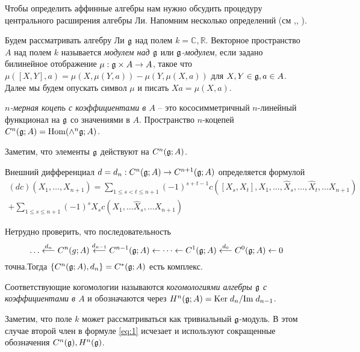 Чтобы определить аффинные алгебры нам нужно обсудить процедуру центрального расширения алгебры Ли.
Напомним несколько определений (см \cite{fuks1986cohomology},\cite{fuks1984}, \cite{feigin1988}).
\begin{definition}
\label{def:1}
Будем рассматривать алгебру Ли $\mathfrak{g}$ над полем $k=\mathbb{C},\mathbb{R}$. Векторное пространство $A$ над полем $k$ называется {\it модулем над $\mathfrak{g}$} или {\it $\mathfrak{g}$-модулем}, если задано билинейное отображение $\mu:\mathfrak{g}\times A\to A$, такое что $\mu([X,Y],a)=\mu(X,\mu(Y,a))-\mu(Y,\mu(X,a))$ для $X,Y\in \mathfrak{g}, a\in A$. Далее мы будем опускать символ $\mu$ и писать $X a= \mu(X,a)$.
\end{definition}
\begin{definition}
  {\it $n$-мерная коцепь с коэффициентами в $A$} -- это кососимметричный $n$-линейный функционал на $\mathfrak{g}$ со значениями в $A$. Пространство $n$-коцепей $C^{n}(\mathfrak{g};A)=\mathrm{Hom}(\wedge^{n}\mathfrak{g};A)$.
\end{definition}
Заметим, что элементы $\mathfrak{g}$ действуют на $C^{n}(\mathfrak{g};A)$.
\begin{definition}
  Внешний дифференциал $d=d_{n}:C^{n}(\mathfrak{g};A)\to C^{n+1}(\mathfrak{g};A)$ определяется формулой
  \begin{multline}
    \label{eq:68}
    (dc) (X_{1},\dots, X_{n+1})=\sum_{1\leq s<t\leq n+1} (-1)^{s+t-1} c([X_{s},X_{t}],X_{1},\dots,\hat X_{s},\dots,\hat X_{t},\dots X_{n+1})\\
    +\sum_{1\leq s\leq n+1} (-1)^{s}X_{s} c(X_{1},\dots \hat X_{s},\dots X_{n+1})
  \end{multline}
\end{definition}
Нетрудно проверить, что последовательность
\begin{equation}
  \label{eq:40}
  \dots\stackrel{d_{n}}{\longleftarrow} C^{n}(g;A)\stackrel{d_{n-1}}{\longleftarrow} C^{n-1}(\mathfrak{g};A)\leftarrow \dots \leftarrow C^{1}(\mathfrak{g};A) \stackrel{d_{0}}{\longleftarrow} C^{0}(\mathfrak{g};A)\leftarrow 0
\end{equation}
точна.Тогда $\{C^{n}(\mathfrak{g};A),d_{n}\}=C^{*}(\mathfrak{g};A)$ есть комплекс.
\begin{definition}
Соответствующие когомологии называются {\it когомологиями алгебры $\mathfrak{g}$ с коэффициентами в $A$} и обозначаются через $H^{n}(\mathfrak{g};A)=\mathrm{Ker}\; d_{n}/\mathrm{Im}\; d_{n-1}$. 
  
\end{definition}
Заметим, что поле $k$ может рассматриваться как тривиальный $\mathfrak{g}$-модуль. В этом случае второй член в формуле \eqref{eq:1} исчезает и используют сокращенные обозначения $C^{n}(\mathfrak{g}), H^{n}(\mathfrak{g})$.
